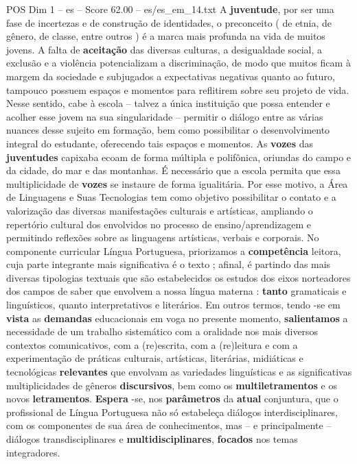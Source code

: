 \begin{textsample}{POS Dim 1 – es – Score 62.00 – es/es\_em\_14.txt}
A \textbf{juventude}, por ser uma fase de incertezas e de construção de identidades, o preconceito ( de etnia, de gênero, de classe, entre outros ) é a marca mais profunda na vida de muitos jovens.
A falta de \textbf{aceitação} das diversas culturas, a desigualdade social, a exclusão e a violência potencializam a discriminação, de modo que muitos ficam à margem da sociedade e subjugados a expectativas negativas quanto ao futuro, tampouco possuem espaços e momentos para reflitirem sobre seu projeto de vida.
Nesse sentido, cabe à escola – talvez a única instituição que possa entender e acolher esse jovem na sua singularidade – permitir o diálogo entre as várias nuances desse sujeito em formação, bem como possibilitar o desenvolvimento integral do estudante, oferecendo tais espaços e momentos.
As \textbf{vozes} das \textbf{juventudes} capixaba ecoam de forma múltipla e polifônica, oriundas do campo e da cidade, do mar e das montanhas.
É necessário que a escola permita que essa multiplicidade de \textbf{vozes} se instaure de forma igualitária.
Por esse motivo, a Área de Linguagens e Suas Tecnologias tem como objetivo possibilitar o contato e a valorização das diversas manifestações culturais e artísticas, ampliando o repertório cultural dos envolvidos no processo de ensino/aprendizagem e permitindo reflexões sobre as linguagens artísticas, verbais e corporais.
No componente curricular Língua Portuguesa, priorizamos a \textbf{competência} leitora, cuja parte integrante mais significativa é o texto ; afinal, é partindo das mais diversas tipologias textuais que são estabelecidos os estudos dos eixos norteadores dos campos de saber que envolvem a nossa língua materna : \textbf{tanto} gramaticais e linguísticos, quanto interpretativos e literários.
Em outros termos, tendo -se em \textbf{vista} as \textbf{demandas} educacionais em voga no presente momento, \textbf{salientamos} a necessidade de um trabalho sistemático com a oralidade nos mais diversos contextos comunicativos, com a (re)escrita, com a (re)leitura e com a experimentação de práticas culturais, artísticas, literárias, midiáticas e tecnológicas \textbf{relevantes} que envolvam as variedades linguísticas e as significativas multiplicidades de gêneros \textbf{discursivos}, bem como os \textbf{multiletramentos} e os novos \textbf{letramentos}. \textbf{Espera} -se, nos \textbf{parâmetros} da \textbf{atual} conjuntura, que o profissional de Língua Portuguesa não só estabeleça diálogos interdisciplinares, com os componentes de sua área de conhecimentos, mas – e principalmente – diálogos transdisciplinares e \textbf{multidisciplinares}, \textbf{focados} nos temas integradores.

\end{textsample}
